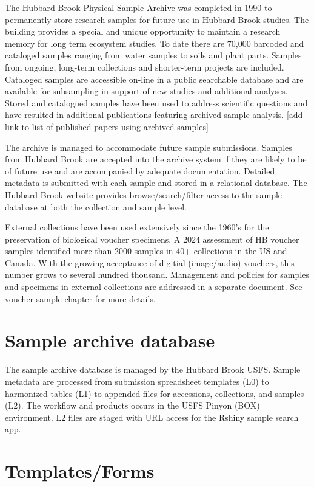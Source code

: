 \documentclass[
  letterpaper,
  DIV=11,
  numbers=noendperiod]{scrreprt}
\begin{document}
The Hubbard Brook Physical Sample Archive was completed in 1990 to
permanently store research samples for future use in Hubbard Brook
studies. The building provides a special and unique opportunity to
maintain a research memory for long term ecosystem studies. To date
there are 70,000 barcoded and cataloged samples ranging from water
samples to soils and plant parts. Samples from ongoing, long-term
collections and shorter-term projects are included. Cataloged samples
are accessible on-line in a public searchable database and are available
for subsampling in support of new studies and additional analyses.
Stored and catalogued samples have been used to address scientific
questions and have resulted in additional publications featuring
archived sample analysis. {[}add link to list of published papers using
archived samples{]}

The archive is managed to accommodate future sample submissions. Samples
from Hubbard Brook are accepted into the archive system if they are
likely to be of future use and are accompanied by adequate
documentation. Detailed metadata is submitted with each sample and
stored in a relational database. The Hubbard Brook website provides
browse/search/filter access to the sample database at both the
collection and sample level.

External collections have been used extensively since the 1960's for the
preservation of biological voucher specimens. A 2024 assessment of HB
voucher samples identified more than 2000 samples in 40+ collections in
the US and Canada. With the growing acceptance of digitial (image/audio)
vouchers, this number grows to several hundred thousand. Management and
policies for samples and specimens in external collections are addressed
in a separate document. See \href{VoucherSamples.qmd}{voucher sample
chapter} for more details.

\section{Sample archive database}\label{sample-archive-database}

The sample archive database is managed by the Hubbard Brook USFS. Sample
metadata are processed from submission spreadsheet templates (L0) to
harmonized tables (L1) to appended files for accessions, collections,
and samples (L2). The workflow and products occurs in the USFS Pinyon
(BOX) environment. L2 files are staged with URL access for the Rshiny
sample search app.

\section{Templates/Forms}\label{templatesforms}
\end{document}

